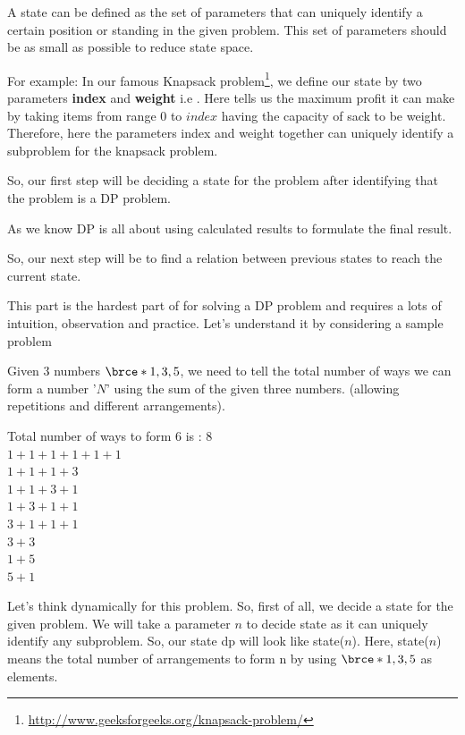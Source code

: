  A state can be defined as the set of parameters that can
uniquely identify a certain position or standing in the given problem. This
set of parameters should be as small as possible to reduce state space.

For example: In our famous Knapsack
problem\footnote{\url{http://www.geeksforgeeks.org/knapsack-problem/}}, we
define our state by two parameters \textbf{index} and \textbf{weight} i.e
.  Here  tells us the maximum
profit it can make by taking items from range $0$ to $index$ having the
capacity of sack to be weight.  Therefore, here the parameters index and
weight together can uniquely identify a subproblem for the knapsack problem.

So, our first step will be deciding a state for the problem after
identifying that the problem is a DP problem.

As we know DP is all about using calculated results to formulate the final
result.

So, our next step will be to find a relation between previous states to
reach the current state.


This part is the hardest part of for solving a DP problem and requires a
lots of intuition, observation and practice. Let's understand it by
considering a sample problem

\begin{mdframed}[style=mdfNOTE]

Given $3$ numbers $\brce*{1,3,5}$, we need to tell the total number of ways
we can form a number '$N$' using the sum of the given three numbers.
(allowing repetitions and different arrangements).

Total number of ways to form $6$ is : $8$\\
$1+1+1+1+1+1$\\
$1+1+1+3$\\
$1+1+3+1$\\
$1+3+1+1$\\
$3+1+1+1$\\
$3+3$\\
$1+5$\\
$5+1$\\

\end{mdframed}

Let's think dynamically for this problem. So, first of all, we decide a
state for the given problem. We will take a parameter $n$ to decide state as
it can uniquely identify any subproblem. So, our state dp will look like
state($n$). Here, state($n$) means the total number of arrangements to form
n by using $\brce*{1,3,5}$ as elements.


